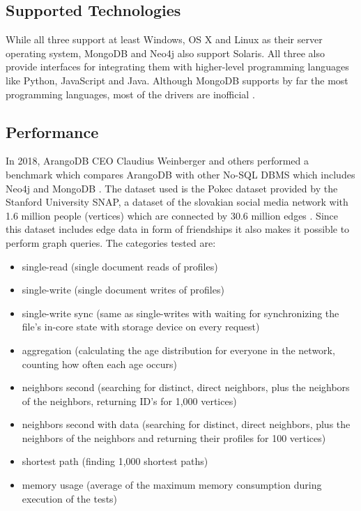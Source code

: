 \subsection{Supported Technologies}

While all three support at least Windows, OS X and Linux as their server operating system, MongoDB and Neo4j also support Solaris. All three also provide interfaces for integrating them with higher-level programming languages like Python, JavaScript and Java. Although MongoDB supports by far the most programming languages, most of the drivers are inofficial \parencite{DBEnginesComparisons}.

\subsection{Performance}

In 2018, ArangoDB CEO Claudius Weinberger and others performed a benchmark which compares ArangoDB with other No-SQL DBMS which includes Neo4j and MongoDB \parencite{DBBenchmark}. The dataset used is the Pokec dataset provided by the Stanford University SNAP, a dataset of the slovakian social media network with 1.6 million people (vertices) which are connected by 30.6 million edges \parencite{Pokec}. Since this dataset includes edge data in form of friendships it also makes it possible to perform graph queries. The categories tested are:

\begin{itemize}
  \item single-read (single document reads of profiles)
  \item single-write (single document writes of profiles)
  \item single-write sync (same as single-writes with waiting for synchronizing the file's in-core state with storage device on every request)
  \item aggregation (calculating the age distribution for everyone in the network, counting how often each age occurs)
  \item neighbors second (searching for distinct, direct neighbors, plus the neighbors of the neighbors, returning ID’s for 1,000 vertices)
  \item neighbors second with data (searching for distinct, direct neighbors, plus the neighbors of the neighbors and returning their profiles for 100 vertices)
  \item shortest path (finding 1,000 shortest paths)
  \item memory usage (average of the maximum memory consumption during execution of the tests)
\end{itemize}

